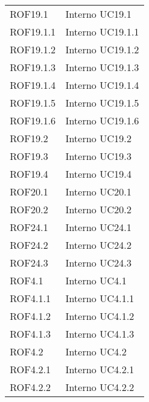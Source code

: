 \begin{longtable}{p{2.5cm}!{\VRule[1pt]}p{2.5cm}}
ROF19.1 & Interno \newline UC19.1
 \\
ROF19.1.1 & Interno \newline UC19.1.1
 \\
ROF19.1.2 & Interno \newline UC19.1.2
 \\
ROF19.1.3 & Interno \newline UC19.1.3
 \\
ROF19.1.4 & Interno \newline UC19.1.4
 \\
ROF19.1.5 & Interno \newline UC19.1.5
 \\
ROF19.1.6 & Interno \newline UC19.1.6
 \\
ROF19.2 & Interno \newline UC19.2
 \\
ROF19.3 & Interno \newline UC19.3
 \\
ROF19.4 & Interno \newline UC19.4
 \\
ROF20.1 & Interno \newline UC20.1
 \\
ROF20.2 & Interno \newline UC20.2
 \\
ROF24.1 & Interno \newline UC24.1
 \\
ROF24.2 & Interno \newline UC24.2
 \\
ROF24.3 & Interno \newline UC24.3
 \\
ROF4.1 & Interno \newline UC4.1
 \\
ROF4.1.1 & Interno \newline UC4.1.1
 \\
ROF4.1.2 & Interno \newline UC4.1.2
 \\
ROF4.1.3 & Interno \newline UC4.1.3
 \\
ROF4.2 & Interno \newline UC4.2
 \\
ROF4.2.1 & Interno \newline UC4.2.1
 \\
ROF4.2.2 & Interno \newline UC4.2.2
 \\

\end{longtable}
